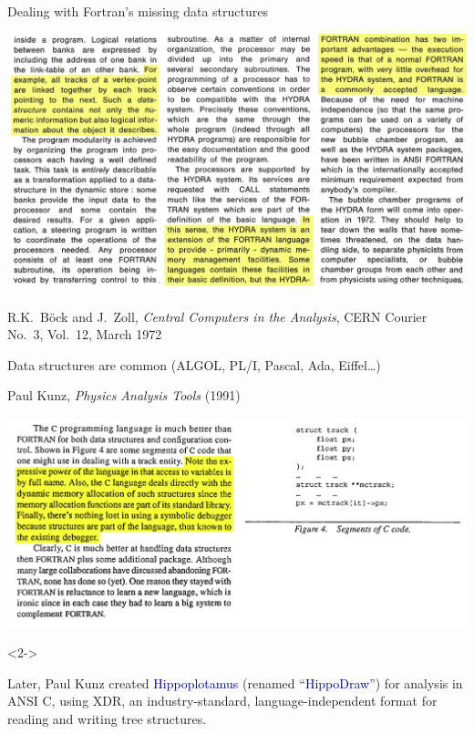 \documentclass[aspectratio=169]{beamer}
\begin{document}
\begin{frame}{Dealing with Fortran's missing data structures}
\scriptsize
\vspace{0.25 cm}
\begin{center}
\includegraphics[width=0.85\linewidth]{PLOTS/hydra-1.png}

R.K.\ B\"ock and J.\ Zoll, {\it Central Computers in the Analysis}, CERN Courier No.\ 3, Vol.\ 12, March 1972
\end{center}
\end{frame}

\begin{frame}{Data structures are common (ALGOL, PL/I, Pascal, Ada, Eiffel\ldots)}
\vspace{0.5 cm}
\begin{center}
\begin{minipage}{0.8\linewidth}
\begin{center}
Paul Kunz, {\it Physics Analysis Tools} (1991)
\end{center}
\end{minipage}

\vspace{0.25 cm}
\includegraphics[width=0.9\linewidth]{PLOTS/kunz-physics-analysis-tools.png}
\end{center}

\begin{uncoverenv}<2->
\vspace{-2.25 cm}
\hfill\begin{minipage}{0.48\linewidth}
Later, Paul Kunz created \textcolor{darkblue}{Hippoplotamus} (renamed ``\textcolor{darkblue}{HippoDraw}'') for analysis in ANSI C, using XDR, an industry-standard, language-independent format for reading and writing tree structures.
\end{minipage}\hspace{-0.25 cm}
\vspace{1.5 cm}
\end{uncoverenv}
\end{frame}
\end{document}
